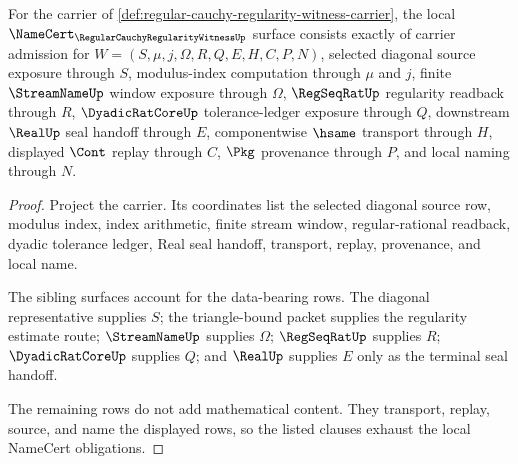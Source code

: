 \begin{theorem}
\label{thm:regular-cauchy-regularity-witness-namecert-obligations}
For the carrier of \autoref{def:regular-cauchy-regularity-witness-carrier}, the local $\NameCert_{\RegularCauchyRegularityWitnessUp}$ surface consists exactly of carrier admission for $W=(S,\mu,j,\Omega,R,Q,E,H,C,P,N)$, selected diagonal source exposure through $S$, modulus-index computation through $\mu$ and $j$, finite $\StreamNameUp$ window exposure through $\Omega$, $\RegSeqRatUp$ regularity readback through $R$, $\DyadicRatCoreUp$ tolerance-ledger exposure through $Q$, downstream $\RealUp$ seal handoff through $E$, componentwise $\hsame$ transport through $H$, displayed $\Cont$ replay through $C$, $\Pkg$ provenance through $P$, and local naming through $N$.
\end{theorem}
\begin{proof}
Project the carrier. Its coordinates list the selected diagonal source row, modulus index, index arithmetic, finite stream window, regular-rational readback, dyadic tolerance ledger, Real seal handoff, transport, replay, provenance, and local name.

The sibling surfaces account for the data-bearing rows. The diagonal representative supplies $S$; the triangle-bound packet supplies the regularity estimate route; $\StreamNameUp$ supplies $\Omega$; $\RegSeqRatUp$ supplies $R$; $\DyadicRatCoreUp$ supplies $Q$; and $\RealUp$ supplies $E$ only as the terminal seal handoff.

The remaining rows do not add mathematical content. They transport, replay, source, and name the displayed rows, so the listed clauses exhaust the local NameCert obligations.
\end{proof}

